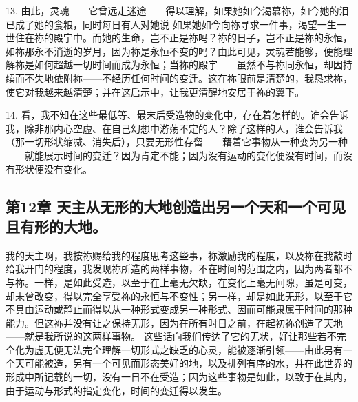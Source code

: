 13. 由此，灵魂——它曾远走迷途——得以理解，如果她如今渴慕祢，如今她的泪已成了她的食粮，同时每日有人对她说 如果她如今向祢寻求一件事，渴望一生一世住在祢的殿宇中。而她的生命，岂不正是祢吗？祢的日子，岂不正是祢的永恒，如祢那永不消逝的岁月，因为祢是永恒不变的吗？由此可见，灵魂若能够，便能理解祢是如何超越一切时间而成为永恒；当祢的殿宇——虽然不与祢同永恒，却因持续而不失地依附祢——不经历任何时间的变迁。这在祢眼前是清楚的，我恳求祢，使它对我越来越清楚；并在这启示中，让我更清醒地安居于祢的翼下。\par

14. 看，我不知在这些最低等、最末后受造物的变化中，存在着怎样的。谁会告诉我，除非那内心空虚、在自己幻想中游荡不定的人？除了这样的人，谁会告诉我（那一切形状缩减、消失后），只要无形性存留——藉着它事物从一种变为另一种——就能展示时间的变迁？因为肯定不能；因为没有运动的变化便没有时间，而没有形状便没有变化。\par


\subsection{第12章 天主从无形的大地创造出另一个天和一个可见且有形的大地。}

我的天主啊，我按祢赐给我的程度思考这些事，祢激励我的程度，以及祢在我敲时给我开门的程度，我发现祢所造的两样事物，不在时间的范围之内，因为两者都不与祢。一样，是如此受造，以至于在上毫无欠缺，在变化上毫无间隙，虽是可变，却未曾改变，得以完全享受祢的永恒与不变性；另一样，却是如此无形，以至于它不具由运动或静止而得以从一种形式变成另一种形式、因而可能隶属于时间的那种能力。但这祢并没有让之保持无形，因为在所有时日之前，在起初祢创造了天地——就是我所说的这两样事物。 这些话向我们传达了它的无状，好让那些若不完全化为虚无便无法完全理解一切形式之缺乏的心灵，能被逐渐引领——由此另有一个天可能被造，另有一个可见而形态美好的地，以及排列有序的水，并在此世界的形成中所记载的一切，没有一日不在受造；因为这些事物是如此，以致于在其内，由于运动与形式的指定变化，时间的变迁得以发生。\par


